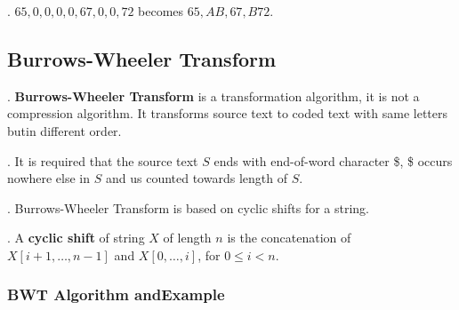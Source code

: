 \documentclass{article}
\begin{document}
\begin{examplee}[].
    $65, 0, 0, 0, 0, 67, 0, 0, 72$ becomes $65, A B, 67, B 72$. 
\end{examplee}

\subsection{Burrows-Wheeler Transform} 

\begin{deff}.
    \textbf{Burrows-Wheeler Transform} is a transformation algorithm, it is not a compression algorithm. It transforms source text to coded text with same letters butin different order. 
\end{deff}

\begin{thmm}[].
    It is required that the source text $S$ ends with end-of-word character \$, \$ occurs nowhere else in $S$ and us counted towards length of $S$. 
\end{thmm}

\begin{comm}[].
    Burrows-Wheeler Transform is based on cyclic shifts for a string. 
\end{comm}

\begin{deff}.
    A \textbf{cyclic shift} of string $X$ of length $n$ is the concatenation of $X[i+1, \ldots, n-1]$ and $X[0, \ldots, i]$, for $0 \leq i < n$. 
\end{deff}

\subsubsection{BWT Algorithm andExample} 
\end{document}
